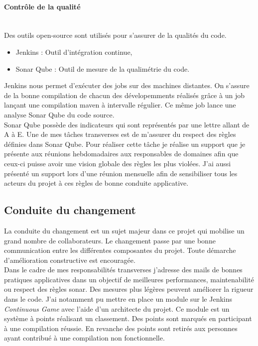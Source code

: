 \documentclass[12pt,a4paper]{article}
\begin{document}
\paragraph{Contrôle de la qualité}
~~\\
Des outils open-source sont utilisés pour s'assurer de la qualités du code. 
\begin{itemize}
\item Jenkins : Outil d'intégration continue,
\item Sonar Qube : Outil de mesure de la qualimétrie du code.
\end{itemize}
Jenkins nous permet d'exécuter des jobs sur des machines distantes. On s'assure de la bonne compilation de chacun des dévelopemments réalisés grâce à un job lançant une compilation maven à intervalle régulier. Ce même job lance une analyse Sonar Qube du code source.\\
Sonar Qube possède des indicateurs qui sont représentés par une lettre allant de A à E. Une de mes tâches transverses est de m'assurer du respect des règles définies dans Sonar Qube. Pour réaliser cette tâche je réalise un support que je présente aux réunions hebdomadaires aux responsables de domaines afin que ceux-ci puisse avoir une vision globale des règles les plus violées. J'ai aussi présenté un support lors d'une réunion mensuelle afin de sensibiliser tous les acteurs du projet à ces règles de bonne conduite applicative.
\subsection{Conduite du changement}
La conduite du changement est un sujet majeur dans ce projet qui mobilise un grand nombre de collaborateurs. Le changement passe par une bonne communication entre les différentes composantes du projet. Toute démarche d'amélioration constructive est encouragée.\\
Dans le cadre de mes responsabilités transverses j'adresse des mails de bonnes pratiques applicatives dans un objectif de meilleures performances, maintenabilité ou respect des règles sonar.
Des mesures plus légères peuvent améliorer la rigueur dans le code. J'ai notamment pu mettre en place un module sur le Jenkins \emph{Continuous Game} avec l'aide d'un architecte du projet. Ce module est un système à points réalisant un classement. Des points sont marqués en participant à une compilation réussie. En revanche des points sont retirés aux personnes ayant contribué à une compilation non fonctionnelle.
\clearpage
\newpage
\end{document}
